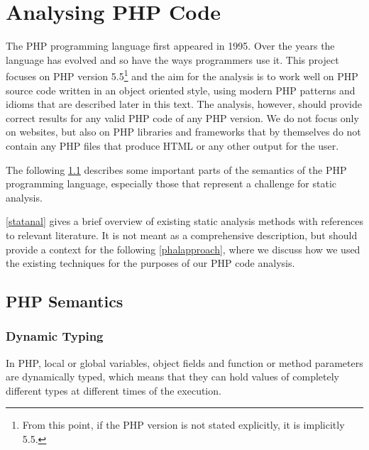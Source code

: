 
\chapter{Analysing PHP Code}
\label{analysingphpcode}

    The PHP programming language first appeared in 1995\cite{phphist}. Over the years 
    the language has evolved and so have the ways programmers use it. 
    This project focuses on PHP version 5.5\footnote{From this point, 
    if the PHP version is not stated explicitly, it is implicitly 5.5.} 
    and the aim for the analysis 
    is to work well on PHP source code written in an object oriented style, 
    using modern PHP patterns and idioms that are described later in 
    this text. The analysis, however, should provide correct results for 
    any valid PHP code of any PHP version. We do not focus only on websites, but also on 
    PHP libraries and frameworks that by themselves do not contain 
    any PHP files that produce HTML or any other output for the user.
    
    The following \wsection{} \ref{phpsem} describes some important parts 
    of the semantics of the PHP programming language, especially those 
    that represent a challenge for static analysis.

    \wSection{} \ref{statanal} gives a brief overview of existing 
    static analysis methods with references to relevant literature. 
    It is  not meant as a comprehensive description, but should provide a 
    context for the following \wsection{} \ref{phalapproach}, 
    where we discuss how we used the existing techniques for the purposes 
    of our PHP code analysis.
    
    \section{PHP Semantics}
    \label{phpsem}

    \subsection{Dynamic Typing}
    In PHP, local or global variables, object fields and function or 
    method parameters are dynamically typed, which means that they 
    can hold values of completely different types at different 
    times of the execution.
    
